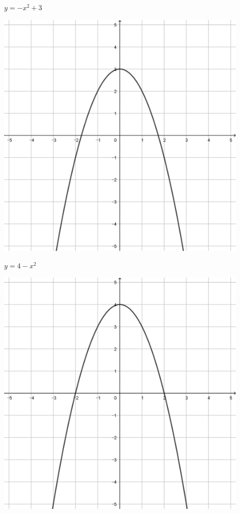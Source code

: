 \documentclass[a4paper]{oblivoir}
\begin{document}
\clearpage
\begin{minipage}{0.45\textwidth}\centering
\(y=-x^2+3\)
\par\bigskip\includegraphics[width=0.9\textwidth]{img/2_quadratic_11}
\end{minipage}
\begin{minipage}{0.45\textwidth}\centering
\(y=4-x^2\)
\par\bigskip\includegraphics[width=0.9\textwidth]{img/2_quadratic_12}
\end{minipage}\bigskip\bigskip\par
\end{document}
